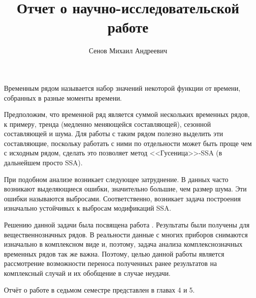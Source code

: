 \documentclass[specialist,
               substylefile = spbu.rtx,
               subf,href,colorlinks=true, 12pt]{disser}
\begin{document}

\title{Отчет о научно-исследовательской работе}


\author{Сенов Михаил Андреевич}


\date{\number\year}

\maketitle

\tableofcontents

\intro
Временным рядом называется набор значений некоторой функции от времени, собранных в разные моменты времени.

Предположим, что временной ряд является суммой нескольких временных рядов, к примеру, тренда (медленно меняющейся составляющей), сезонной составляющей и шума. Для работы с таким рядом полезно выделить эти составляющие, поскольку работать с ними по отдельности может быть проще чем с исходным рядом, сделать это позволяет метод <<Гусеница>>-SSA (в дальнейшем просто SSA).

При подобном анализе возникает следующее затруднение. В данных часто возникают выделяющиеся ошибки, значительно большие, чем размер шума. Эти ошибки называются выбросами. Соответственно, возникает задача построения изначально устойчивых к выбросам модификаций SSA. 

Решению данной задачи была посвящена работа \cite{Tretyakova20}. Результаты были получены для вещественнозначных рядов. В реальности данные с многих приборов снимаются изначально в комплексном виде и, поэтому, задача анализа комплекснозначных временных рядов так же важна. Поэтому, целью данной работы является рассмотрение возможности переноса полученных ранее результатов на комплексный случай и их обобщение в случае неудачи.

Отчёт о работе в седьмом семестре представлен в главах 4 и 5.
\end{document}
